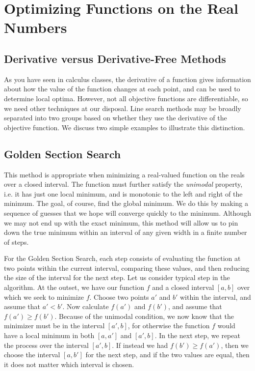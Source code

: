 \section*{Optimizing Functions on the Real Numbers}
\subsection*{Derivative versus Derivative-Free Methods}
As you have seen in calculus classes, the derivative of a function gives information
about how the value of the function changes at each point, and can be used to determine
local optima. However, not all objective functions are differentiable, so we need other
techniques at our disposal. Line search methods may be broadly separated into two groups
based on whether they use the derivative of the objective function. We discuss two
simple examples to illustrate this distinction.

\subsection*{Golden Section Search}
This method is appropriate when minimizing a real-valued function on the reals over a
closed interval. The function must further satisfy the \emph{unimodal} property, i.e.
it has just one local minimum, and is monotonic to the left and right of the minimum.
The goal, of course, find the
global minimum. We do this by making a sequence of guesses that we hope will converge
quickly to the minimum. Although we may not end up with the exact minimum, this method
will allow us to pin down the true minimum within an interval of any given width in a
finite number of steps.

For the Golden Section Search, each step consists of evaluating the function at two
points within the current interval, comparing these values, and then reducing the size
of the interval for the next step. Let us consider typical step in the algorithm. At
the outset, we have our function $f$ and a closed interval $[a, b]$ over which we seek
to minimize $f$. Choose two points $a'$ and $b'$ within the interval, and assume that
$a' < b'$. Now calculate $f(a')$ and $f(b')$, and assume that $f(a') \geq f(b')$.
Because of the unimodal condition, we now know that the minimizer must be in the
interval $[a', b]$, for otherwise the function $f$ would have a local minimum in
both $[a, a']$ and $[a', b]$. In the next step, we repeat the process over the interval
$[a', b]$. If instead we had $f(b') \geq f(a')$, then we choose the interval $[a, b']$
for the next step, and if the two values are equal, then it does not matter which
interval is chosen.

